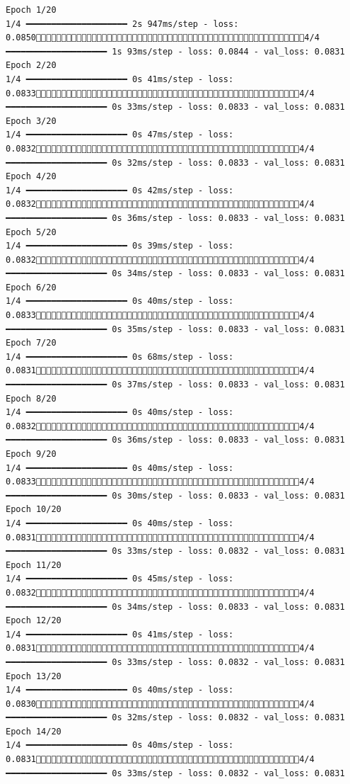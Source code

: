 \documentclass[
  letterpaper,
  DIV=11,
  numbers=noendperiod]{scrreprt}
\begin{document}
\begin{verbatim}
Epoch 1/20
1/4 ━━━━━━━━━━━━━━━━━━━━ 2s 947ms/step - loss: 0.08504/4 ━━━━━━━━━━━━━━━━━━━━ 1s 93ms/step - loss: 0.0844 - val_loss: 0.0831
Epoch 2/20
1/4 ━━━━━━━━━━━━━━━━━━━━ 0s 41ms/step - loss: 0.08334/4 ━━━━━━━━━━━━━━━━━━━━ 0s 33ms/step - loss: 0.0833 - val_loss: 0.0831
Epoch 3/20
1/4 ━━━━━━━━━━━━━━━━━━━━ 0s 47ms/step - loss: 0.08324/4 ━━━━━━━━━━━━━━━━━━━━ 0s 32ms/step - loss: 0.0833 - val_loss: 0.0831
Epoch 4/20
1/4 ━━━━━━━━━━━━━━━━━━━━ 0s 42ms/step - loss: 0.08324/4 ━━━━━━━━━━━━━━━━━━━━ 0s 36ms/step - loss: 0.0833 - val_loss: 0.0831
Epoch 5/20
1/4 ━━━━━━━━━━━━━━━━━━━━ 0s 39ms/step - loss: 0.08324/4 ━━━━━━━━━━━━━━━━━━━━ 0s 34ms/step - loss: 0.0833 - val_loss: 0.0831
Epoch 6/20
1/4 ━━━━━━━━━━━━━━━━━━━━ 0s 40ms/step - loss: 0.08334/4 ━━━━━━━━━━━━━━━━━━━━ 0s 35ms/step - loss: 0.0833 - val_loss: 0.0831
Epoch 7/20
1/4 ━━━━━━━━━━━━━━━━━━━━ 0s 68ms/step - loss: 0.08314/4 ━━━━━━━━━━━━━━━━━━━━ 0s 37ms/step - loss: 0.0833 - val_loss: 0.0831
Epoch 8/20
1/4 ━━━━━━━━━━━━━━━━━━━━ 0s 40ms/step - loss: 0.08324/4 ━━━━━━━━━━━━━━━━━━━━ 0s 36ms/step - loss: 0.0833 - val_loss: 0.0831
Epoch 9/20
1/4 ━━━━━━━━━━━━━━━━━━━━ 0s 40ms/step - loss: 0.08334/4 ━━━━━━━━━━━━━━━━━━━━ 0s 30ms/step - loss: 0.0833 - val_loss: 0.0831
Epoch 10/20
1/4 ━━━━━━━━━━━━━━━━━━━━ 0s 40ms/step - loss: 0.08314/4 ━━━━━━━━━━━━━━━━━━━━ 0s 33ms/step - loss: 0.0832 - val_loss: 0.0831
Epoch 11/20
1/4 ━━━━━━━━━━━━━━━━━━━━ 0s 45ms/step - loss: 0.08324/4 ━━━━━━━━━━━━━━━━━━━━ 0s 34ms/step - loss: 0.0833 - val_loss: 0.0831
Epoch 12/20
1/4 ━━━━━━━━━━━━━━━━━━━━ 0s 41ms/step - loss: 0.08314/4 ━━━━━━━━━━━━━━━━━━━━ 0s 33ms/step - loss: 0.0832 - val_loss: 0.0831
Epoch 13/20
1/4 ━━━━━━━━━━━━━━━━━━━━ 0s 40ms/step - loss: 0.08304/4 ━━━━━━━━━━━━━━━━━━━━ 0s 32ms/step - loss: 0.0832 - val_loss: 0.0831
Epoch 14/20
1/4 ━━━━━━━━━━━━━━━━━━━━ 0s 40ms/step - loss: 0.08314/4 ━━━━━━━━━━━━━━━━━━━━ 0s 33ms/step - loss: 0.0832 - val_loss: 0.0831

\end{verbatim}
\end{document}
